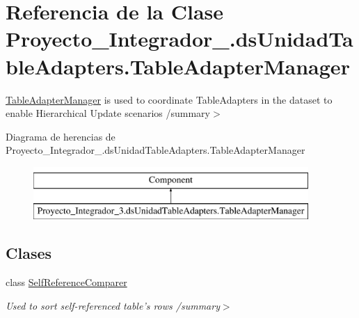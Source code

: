 \hypertarget{class_proyecto___integrador__3_1_1ds_unidad_table_adapters_1_1_table_adapter_manager}{\section{Referencia de la Clase Proyecto\-\_\-\-Integrador\-\_.\-ds\-Unidad\-Table\-Adapters.\-Table\-Adapter\-Manager}
\label{class_proyecto___integrador__3_1_1ds_unidad_table_adapters_1_1_table_adapter_manager}
}


\hyperlink{class_proyecto___integrador__3_1_1ds_unidad_table_adapters_1_1_table_adapter_manager}{Table\-Adapter\-Manager} is used to coordinate Table\-Adapters in the dataset to enable Hierarchical Update scenarios /summary$>$  


Diagrama de herencias de Proyecto\-\_\-\-Integrador\-\_.\-ds\-Unidad\-Table\-Adapters.\-Table\-Adapter\-Manager\begin{figure}[H]
\begin{center}
\leavevmode
\includegraphics[height=2.000000cm]{dd/d33/class_proyecto___integrador__3_1_1ds_unidad_table_adapters_1_1_table_adapter_manager}
\end{center}
\end{figure}
\subsection*{Clases}
\begin{DoxyCompactItemize}
\item 
class \hyperlink{class_proyecto___integrador__3_1_1ds_unidad_table_adapters_1_1_table_adapter_manager_1_1_self_reference_comparer}{Self\-Reference\-Comparer}
\begin{DoxyCompactList}\small\item\em Used to sort self-\/referenced table's rows /summary$>$ \end{DoxyCompactList}\end{DoxyCompactItemize}
